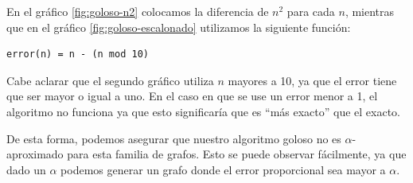 En el gráfico \ref{fig:goloso-n2} colocamos la diferencia de $n^2$ para cada $n$, mientras que en el gráfico \ref{fig:goloso-escalonado} utilizamos la siguiente función:
\begin{verbatim}
error(n) = n - (n mod 10)
\end{verbatim}

Cabe aclarar que el segundo gráfico utiliza $n$ mayores a 10, ya que el error tiene que ser mayor o igual a uno. En el caso en que se use un error menor a 1, el algoritmo no funciona ya que esto significaría que es ``más exacto'' que el exacto.

De esta forma, podemos asegurar que nuestro algoritmo goloso no es $\alpha$-aproximado para esta familia de grafos. Esto se puede observar fácilmente, ya que dado un $\alpha$ podemos generar un grafo donde el error proporcional sea mayor a $\alpha$.
